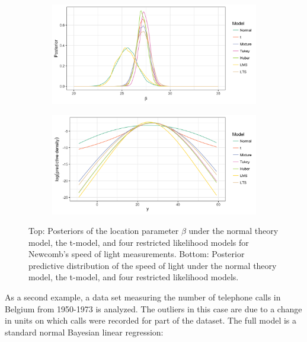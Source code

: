 \documentclass[12pt]{article}
\begin{document}
\begin{figure}
\centering
\begin{subfigure}{\textwidth}
{\includegraphics[width = 6in]{figs/speed_of_light_beta.png}}
\end{subfigure}
\centering
\begin{subfigure}{\textwidth}
{\includegraphics[width = 6in]{figs/speed_of_light_predictive.png}}
\end{subfigure}
\caption{Top: Posteriors of the location parameter $\beta$ under the normal theory model, the t-model, and four restricted likelihood models for Newcomb's speed of light measurements. Bottom: Posterior predictive distribution of the speed of light under the normal theory model, the t-model, and four restricted likelihood models.}
\label{fig:newcomb_post}
\end{figure}

As a second example, a data set measuring the number of telephone calls in Belgium from 1950-1973 is analyzed. The outliers in this case are due to a change in units on which calls were recorded for part of the dataset. The full model is a standard normal Bayesian linear regression:
\end{document}

